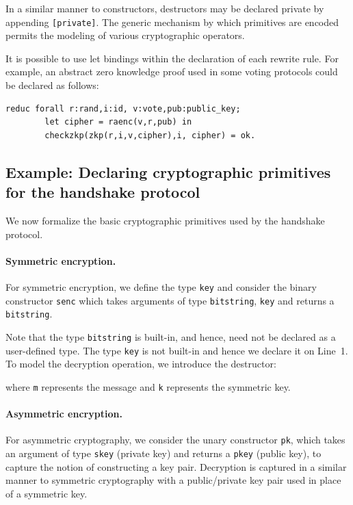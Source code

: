 \documentclass{book}
\newcommand{\tblue}[1]{\textcolor{blue}{REMARK: \emph{#1}}}
\renewcommand{\marginpar}[1]{\tblue{#1}}
\begin{document}
In a similar manner to constructors, destructors may be declared private by appending \lstinline![private]!. The generic mechanism by which primitives are encoded permits the modeling of various cryptographic operators.

It is possible to use let bindings within the declaration of each rewrite rule. For example, an abstract zero knowledge proof used in some voting protocols could be declared as follows:

\begin{lstlisting}[numbers=none]
	reduc forall r:rand,i:id, v:vote,pub:public_key;
		let cipher = raenc(v,r,pub) in
		checkzkp(zkp(r,i,v,cipher),i, cipher) = ok.
\end{lstlisting}

\subsection{Example: Declaring cryptographic primitives for the handshake protocol}\label{sec:exHandshakeCrypto}

We now formalize the basic cryptographic primitives used by the handshake protocol.


\paragraph{Symmetric encryption.} For symmetric encryption, we define the type \lstinline{key} and consider the binary constructor \lstinline{senc} which takes arguments of type \lstinline{bitstring}, \lstinline{key} and returns a \lstinline{bitstring}.
%

%
Note that the type \lstinline!bitstring! is built-in, and hence, need not be declared as a user-defined type. The type \lstinline{key} is not built-in and hence we declare it on Line~1. To model the decryption operation, we introduce the destructor:
%

%
where \lstinline{m} represents the message and \lstinline{k} represents the symmetric key.

\paragraph{Asymmetric encryption.} For asymmetric cryptography, we consider the unary constructor \lstinline{pk}, which takes an argument of type \lstinline{skey} (private key) and returns a \lstinline{pkey} (public key), to capture the notion of constructing a key pair. Decryption is captured in a similar manner to symmetric cryptography with a public/private key pair used in place of a symmetric key.
%

%
\end{document}
